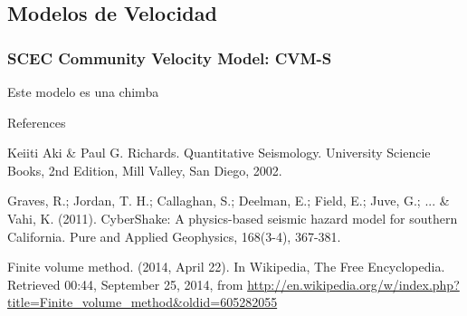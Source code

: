 \documentclass{beamer}
\begin{document}
\subsection{Modelos de Velocidad}
\begin{frame}[allowframebreaks]
\frametitle{SCEC Community Velocity Model: CVM-S}
%
\justifying
Este modelo es una chimba
%
\end{frame}
%
%
\begin{frame}[allowframebreaks]{References}
\def\newblock{}
%
%

\begin{thebibliography}{1}

 Keiiti Aki \& Paul G. Richards. {Q}uantitative {S}eismology. University Sciencie Books, 2nd Edition, Mill Valley, San Diego, 2002.

 Graves, R.; Jordan, T. H.; Callaghan, S.; Deelman, E.; Field, E.; Juve, G.; ... \& Vahi, K. (2011). CyberShake: A physics-based seismic hazard model for southern California. Pure and Applied Geophysics, 168(3-4), 367-381.

 Finite volume method. (2014, April 22). In Wikipedia, The Free Encyclopedia. Retrieved 00:44, September 25, 2014, from \url{http://en.wikipedia.org/w/index.php?title=Finite_volume_method&oldid=605282055}

\end{thebibliography}

\end{frame}
\end{document}
